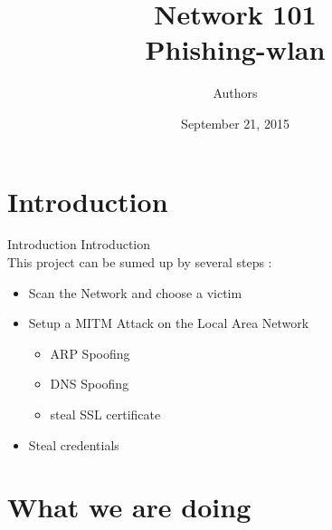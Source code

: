 \documentclass{beamer}
\title[Phishing-Wlan]{Network 101\\Phishing-wlan}
\author{Authors}
\institute{Institute}
\date{September 21, 2015}
\begin{document}
\begin{frame}
	\titlepage
\end{frame}


\section{Introduction}
\begin{frame}{Introduction}
	Introduction\\
	This project can be sumed up by several steps :\\
	\begin{itemize}
		\pause \item Scan the Network and choose a victim\\
		\pause \item Setup a MITM Attack on the Local Area Network\\
			\begin{itemize}
    			\pause \item ARP Spoofing\\
    			\pause \item DNS Spoofing\\
    			\pause \item steal SSL certificate\\
    		\end{itemize}
		\pause \item Steal credentials\\
	\end{itemize}
\end{frame}

\section{What we are doing}
\end{document}
